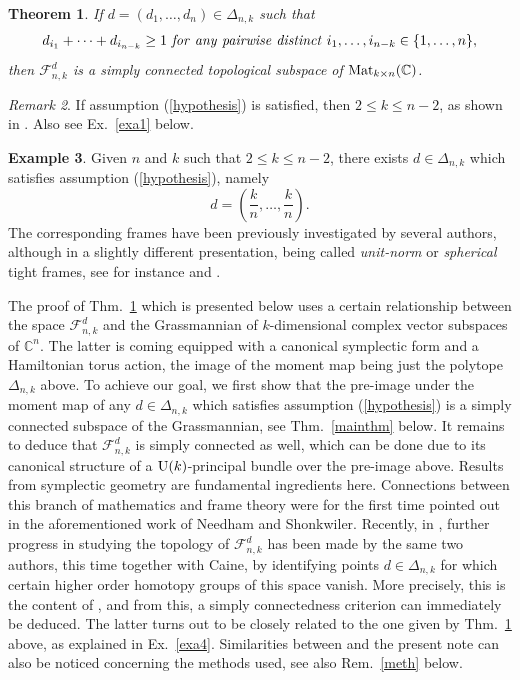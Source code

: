 \documentclass[12pt]{amsart}
\newtheorem{thm}{Theorem}[section]
\theoremstyle{definition}
\newtheorem{ex}[thm]{Example}
\theoremstyle{remark}
\newtheorem{rem}[thm]{Remark}
\newcommand{\CC}{\mathbb C}
\begin{document}
\begin{thm}\label{2mainthm}  If $d=(d_1, \ldots, d_n)\in \Delta_{n,k}$  such that  
\begin{equation} \label{hypothesis} d_{i_1} +\cdots + d_{i_{n-k}}\ge 1 \ {\it 
 for \ any \ pairwise  \  distinct } \ i_1, \ldots, i_{n-k} \in \{1, \ldots, n\}, \end{equation} then ${\mathcal F}_{n,k}^d$
is a simply connected topological subspace of ${\rm Mat}_{k\times n}(\CC)$. 
\end{thm}

\begin{rem}\label{lege}
If assumption 
 (\ref{hypothesis}) is satisfied, then $ 2\le k \le n- 2$, as shown in \cite[Rem.~1.3]{Mare}. Also see Ex.~\ref{exa1} below. 
\end{rem}

\begin{ex}\label{example1}
Given $n$ and $k$ such that $2\le k \le n-2$, there exists $d\in \Delta_{n,k}$ which satisfies 
assumption (\ref{hypothesis}), namely  $$d=\left(\frac{k}{n}, \ldots, \frac{k}{n}\right).$$
The corresponding  frames have been previously investigated by several authors, although in a slightly different presentation,
being called {\it unit-norm} or {\it spherical} tight frames, see  for instance \cite{DS} and \cite{CMS}. 
 \end{ex} 


The proof of Thm.~\ref{2mainthm} which is presented below uses a certain relationship between the space ${\mathcal F}_{n,k}^d$ 
and the Grassmannian of $k$-dimensional complex vector subspaces of $\CC^n$. The latter is coming equipped with a canonical symplectic form and a Hamiltonian torus action, the image of the  moment map being just the polytope $\Delta_{n,k}$ above.  
To achieve our goal, we first show  that the pre-image under the moment map of any $d\in \Delta_{n,k}$ which satisfies  assumption (\ref{hypothesis}) is a simply connected subspace of the Grassmannian, see Thm.~\ref{mainthm} below. It  remains to  deduce that ${\mathcal F}_{n,k}^d$ is simply connected as well, which can be done due to its  canonical structure of a ${\rm U}(k)$-principal bundle over the pre-image above. 
Results  from symplectic geometry are fundamental ingredients here. Connections between this branch of mathematics and frame theory were for the first time pointed out in the aforementioned work \cite{NS1} of  Needham and Shonkwiler. Recently, in \cite{CNS},  further progress in studying the topology of ${\mathcal F}_{n,k}^d$
has been made by the same two authors, this time together with Caine, by identifying points $d\in  \Delta_{n,k}$ for which certain higher order homotopy groups of this space vanish. More precisely, this is the content of \cite[Thm.~4.5]{CNS}, and from this, a simply connectedness criterion can immediately be deduced. The latter turns out to be closely related to  
the one given by Thm.~\ref{2mainthm}  above, as explained in Ex.~\ref{exa4}. 
Similarities between \cite[Sect.~4]{CNS} and the present note can also be noticed concerning  the methods used, see also Rem.~\ref{meth} below.
\end{document}
